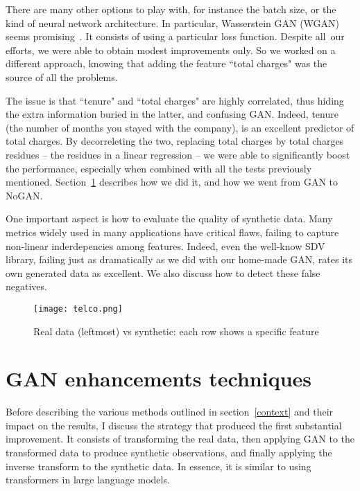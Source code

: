 \documentclass[oneside,10pt]{book}
\begin{document}
\noindent There are many other options to play with, for instance the 
\textcolor{index}{batch size}, or the kind of neural network architecture. In particular,
 \textcolor{index}{Wasserstein GAN} (WGAN) seems promising~\cite{ieeewgan}. %
It consists of using a particular loss function. 
 Despite all~our efforts, we were able to obtain modest improvements only. So we worked on a different approach, knowing that
 adding the feature ``total charges" was the source of all the problems.

The issue is that ``tenure" and ``total charges" are highly correlated, thus hiding the extra information buried in the latter, and confusing GAN.
 Indeed, tenure (the number of months you stayed with the company), is an excellent predictor of total charges. By decorreleting the two,
 replacing total charges by total charges residues -- the residues in a linear regression -- we were able to significantly boost the performance,
 especially when combined with all the tests previously mentioned. Section~\ref{potxs} describes how we did it, and how we went from GAN to NoGAN.

One important aspect is how to evaluate the quality of synthetic data. Many metrics widely used in many applications have critical flaws, failing to capture non-linear inderdepencies among features. Indeed, even the well-know SDV library, failing just as dramatically as we did with our home-made GAN, rates its
 own generated  data as excellent. We also discuss how to detect these false negatives. 

\begin{figure}[H]
\centering
\texttt{[image: telco.png]} %
\caption{Real data (leftmost) vs synthetic:  each row shows a specific feature}
\label{fig:nogvvc}
\end{figure}

\section{GAN enhancements techniques}\label{potxs}

Before describing the various methods outlined in section~\ref{context} and their impact on the results, I discuss the strategy that produced
 the first substantial improvement. It consists of transforming the real data, then applying GAN to the transformed data to produce synthetic observations, and finally applying the inverse transform to the synthetic data. In essence, it is similar to using 
\textcolor{index}{transformers}
 in large language models.
\end{document}
